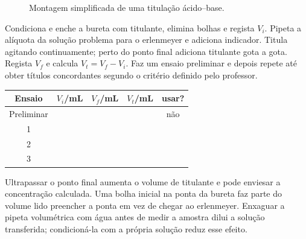 \documentclass[11pt,a4paper,openany]{book}
\begin{document}
\begin{figure}[H]
\centering
{}
\caption{Montagem simplificada de uma titulação ácido--base.}
\end{figure}

\begin{metodo}
Condiciona e enche a bureta com titulante, elimina bolhas e regista $V_i$. Pipeta a alíquota da solução problema para o erlenmeyer e adiciona indicador. Titula agitando continuamente; perto do ponto final adiciona titulante gota a gota. Regista $V_f$ e calcula $V_t=V_f-V_i$. Faz um ensaio preliminar e depois repete até obter títulos concordantes segundo o critério definido pelo professor.
\end{metodo}

\begin{registo}
\begin{center}
\begin{tabular}{@{}ccccc@{}}
\toprule
Ensaio & $V_i$/mL & $V_f$/mL & $V_t$/mL & usar?\\
\midrule
Preliminar & & & & não\\
1 & & & &\\ 2 & & & &\\ 3 & & & &\\
\bottomrule
\end{tabular}
\end{center}
\end{registo}

\begin{erros}
Ultrapassar o ponto final aumenta o volume de titulante e pode enviesar a concentração calculada. Uma bolha inicial na ponta da bureta faz parte do volume lido preencher a ponta em vez de chegar ao erlenmeyer. Enxaguar a pipeta volumétrica com água antes de medir a amostra dilui a solução transferida; condicioná-la com a própria solução reduz esse efeito.
\end{erros}
\end{document}
